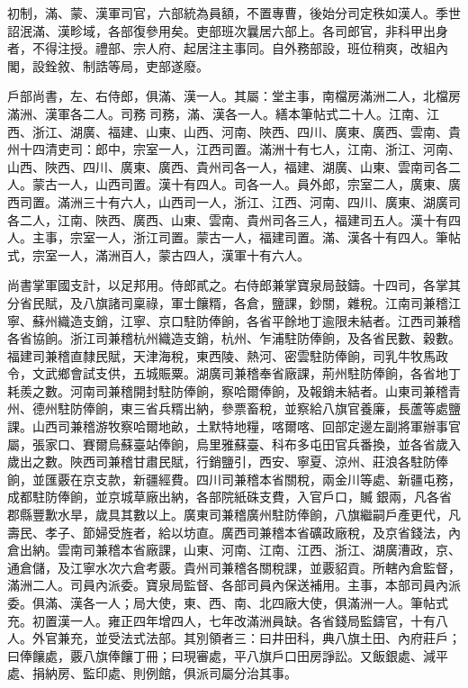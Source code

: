 \begin{pinyinscope}
初制，滿、蒙、漢軍司官，六部統為員額，不置專曹，後始分司定秩如漢人。季世詔泯滿、漢畛域，各部復參用矣。吏部班次曩居六部上。各司郎官，非科甲出身者，不得注授。禮部、宗人府、起居注主事同。自外務部設，班位稍爽，改組內閣，設銓敘、制誥等局，吏部遂廢。

戶部尚書，左、右侍郎，俱滿、漢一人。其屬：堂主事，南檔房滿洲二人，北檔房滿洲、漢軍各二人。司務司務，滿、漢各一人。繕本筆帖式二十人。江南、江西、浙江、湖廣、福建、山東、山西、河南、陜西、四川、廣東、廣西、雲南、貴州十四清吏司：郎中，宗室一人，江西司置。滿洲十有七人，江南、浙江、河南、山西、陜西、四川、廣東、廣西、貴州司各一人，福建、湖廣、山東、雲南司各二人。蒙古一人，山西司置。漢十有四人。司各一人。員外郎，宗室二人，廣東、廣西司置。滿洲三十有六人，山西司一人，浙江、江西、河南、四川、廣東、湖廣司各二人，江南、陜西、廣西、山東、雲南、貴州司各三人，福建司五人。漢十有四人。主事，宗室一人，浙江司置。蒙古一人，福建司置。滿、漢各十有四人。筆帖式，宗室一人，滿洲百人，蒙古四人，漢軍十有六人。

尚書掌軍國支計，以足邦用。侍郎貳之。右侍郎兼掌寶泉局鼓鑄。十四司，各掌其分省民賦，及八旗諸司稟祿，軍士饟糈，各倉，鹽課，鈔關，雜稅。江南司兼稽江寧、蘇州織造支銷，江寧、京口駐防俸餉，各省平餘地丁逾限未結者。江西司兼稽各省協餉。浙江司兼稽杭州織造支銷，杭州、乍浦駐防俸餉，及各省民數、穀數。福建司兼稽直隸民賦，天津海稅，東西陵、熱河、密雲駐防俸餉，司乳牛牧馬政令，文武鄉會試支供，五城賑粟。湖廣司兼稽奉省廠課，荊州駐防俸餉，各省地丁耗羨之數。河南司兼稽開封駐防俸餉，察哈爾俸餉，及報銷未結者。山東司兼稽青州、德州駐防俸餉，東三省兵糈出納，參票畜稅，並察給八旗官養廉，長蘆等處鹽課。山西司兼稽游牧察哈爾地畝，土默特地糧，喀爾喀、回部定邊左副將軍辦事官屬，張家口、賽爾烏蘇臺站俸餉，烏里雅蘇臺、科布多屯田官兵番換，並各省歲入歲出之數。陜西司兼稽甘肅民賦，行銷鹽引，西安、寧夏、涼州、莊浪各駐防俸餉，並匯覈在京支款，新疆經費。四川司兼稽本省關稅，兩金川等處、新疆屯務，成都駐防俸餉，並京城草廠出納，各部院紙硃支費，入官戶口，贓銀兩，凡各省郡縣豐歉水旱，歲具其數以上。廣東司兼稽廣州駐防俸餉，八旗繼嗣戶產更代，凡壽民、孝子、節婦受旌者，給以坊直。廣西司兼稽本省礦政廠稅，及京省錢法，內倉出納。雲南司兼稽本省廠課，山東、河南、江南、江西、浙江、湖廣漕政，京、通倉儲，及江寧水次六倉考覈。貴州司兼稽各關稅課，並覈貂貢。所轄內倉監督，滿洲二人。司員內派委。寶泉局監督、各部司員內保送補用。主事，本部司員內派委。俱滿、漢各一人；局大使，東、西、南、北四廠大使，俱滿洲一人。筆帖式充。初置漢一人。雍正四年增四人，七年改滿洲員缺。各省錢局監鑄官，十有八人。外官兼充，並受法式法部。其別領者三：曰井田科，典八旗土田、內府莊戶；曰俸饟處，覈八旗俸饟丁冊；曰現審處，平八旗戶口田房諍訟。又飯銀處、減平處、捐納房、監印處、則例館，俱派司屬分治其事。


\end{pinyinscope}
